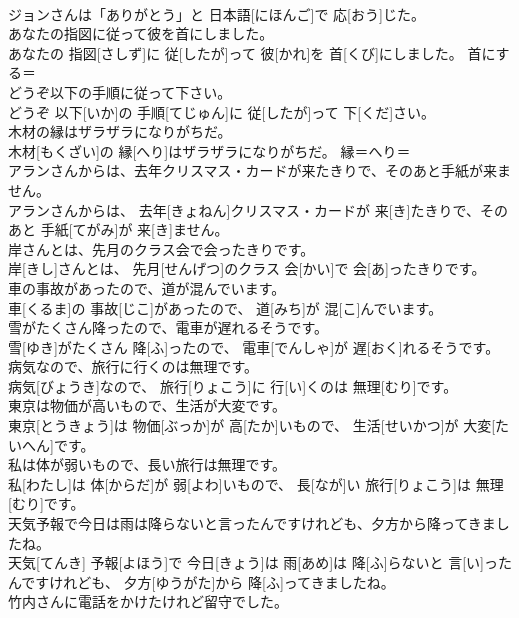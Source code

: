 \documentclass[8pt]{extreport}
\begin{document}
\begin{CJK}{UTF8}{min}
\\	ジョンさんは「ありがとう」と 日本語[にほんご]で 応[おう]じた。	
\\	あなたの指図に従って彼を首にしました。	
\\	あなたの 指図[さしず]に 従[したが]って 彼[かれ]を 首[くび]にしました。	首にする＝ 
\\	どうぞ以下の手順に従って下さい。	
\\	どうぞ 以下[いか]の 手順[てじゅん]に 従[したが]って 下[くだ]さい。	
\\	木材の縁はザラザラになりがちだ。	
\\	木材[もくざい]の 縁[へり]はザラザラになりがちだ。	縁＝へり＝ 
\\	アランさんからは、去年クリスマス・カードが来たきりで、そのあと手紙が来ません。	
\\	アランさんからは、 去年[きょねん]クリスマス・カードが 来[き]たきりで、そのあと 手紙[てがみ]が 来[き]ません。	
\\	岸さんとは、先月のクラス会で会ったきりです。	
\\	岸[きし]さんとは、 先月[せんげつ]のクラス 会[かい]で 会[あ]ったきりです。	
\\	車の事故があったので、道が混んでいます。	
\\	車[くるま]の 事故[じこ]があったので、 道[みち]が 混[こ]んでいます。	
\\	雪がたくさん降ったので、電車が遅れるそうです。	
\\	雪[ゆき]がたくさん 降[ふ]ったので、 電車[でんしゃ]が 遅[おく]れるそうです。	
\\	病気なので、旅行に行くのは無理です。	
\\	病気[びょうき]なので、 旅行[りょこう]に 行[い]くのは 無理[むり]です。	
\\	東京は物価が高いもので、生活が大変です。	
\\	東京[とうきょう]は 物価[ぶっか]が 高[たか]いもので、 生活[せいかつ]が 大変[たいへん]です。	
\\	私は体が弱いもので、長い旅行は無理です。	
\\	私[わたし]は 体[からだ]が 弱[よわ]いもので、 長[なが]い 旅行[りょこう]は 無理[むり]です。	
\\	天気予報で今日は雨は降らないと言ったんですけれども、夕方から降ってきましたね。	
\\	天気[てんき] 予報[よほう]で 今日[きょう]は 雨[あめ]は 降[ふ]らないと 言[い]ったんですけれども、 夕方[ゆうがた]から 降[ふ]ってきましたね。	
\\	竹内さんに電話をかけたけれど留守でした。	

\end{CJK}
\end{document}
